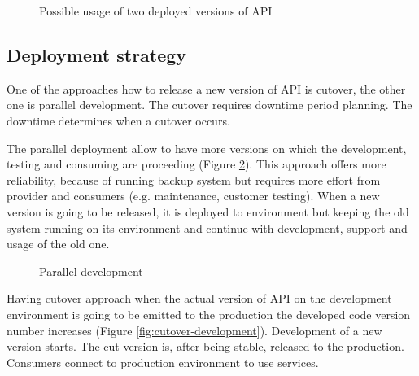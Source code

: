 \begin{figure}[htp] 
\caption{Possible usage of two deployed versions of API}
\label{fig:consumer-server}
\end{figure} 


\subsection{Deployment strategy}
One of the approaches how to release a new version of API is cutover, the other one is parallel development. The cutover requires downtime period planning. The downtime determines when a cutover occurs. 

The parallel deployment allow to have more versions on which the development, testing and consuming are proceeding (Figure \ref{fig:parellel-development}). This approach offers more reliability, because of running backup system but requires more effort from provider and consumers (e.g. maintenance, customer testing). When a new version is going to be released, it is deployed to environment but keeping the old system running on its environment and continue with development, support and usage of the old one. 

\begin{figure}[htp] 
\caption{Parallel development}
\label{fig:parellel-development}
\end{figure} 

Having cutover approach when the actual version of API on the development environment is going to be emitted to the production the developed code version number increases (Figure \ref{fig:cutover-development}). Development of a new version starts. The cut version is, after being stable, released to the production. Consumers connect to production environment to use services. 

